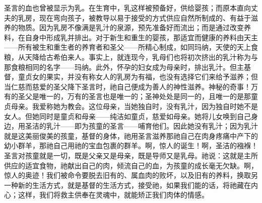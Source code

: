 圣言的血也曾被显示为乳。在生育中，乳这样被预备好，供给婴孩；而原本直向丈夫的乳房，现在弯向孩子，被教导以易于接受的方式供应自然所制成的、有益于滋养的物质。因为乳房不像满是乳汁的泉源，预先准备好而流出；而是通过改变养料，在自身中形成乳并排出。对于新生和重生的婴孩，那适宜而健康的养料由天主——所有被生和重生者的养育者和圣父——所精心制成，如同玛纳，天使的天上食粮，从天降给古希伯来人。事实上，就连现今，乳母们也将初次挤出的乳汁称为与那食粮相同的名字——玛纳。此外，怀孕的妇女成为母亲时，排出乳汁。但主基督，童贞女的果实，并没有称女人的乳房为有福，也没有选择它们来给予滋养；但当仁慈而慈爱的圣父降下圣言时，祂自己便成为善人的神性滋养。神秘的奇事！万有的圣父是唯一的，万有的圣言也是唯一的；圣神处处是同一的，且唯一的是那童贞母亲。我爱称她为教会。这位母亲，当她独自时，没有乳汁，因为独自时她不是女人。但她同时是童贞和母亲——纯洁如童贞，慈爱如母亲。她将儿女唤到自己身边，用圣洁的乳汁——即为孩童的圣言——哺育他们。因此她没有乳汁；因为乳汁就是这美丽俊美的孩童，基督的身体，祂用圣言滋养那祂自己在肉身疼痛中产下的幼小群羊，那祂自己用祂的宝血包裹的群羊。啊，惊人的诞生！啊，圣洁的襁褓！圣言对孩童就是一切，既是父亲又是母亲，既是导师又是乳母。祂说：这就是主所供应的适宜食物，祂献出自己的肉，倾流自己的血，为孩童的成长毫无欠缺。啊，惊人的奥迹！我们被命令要脱去旧有的、属血肉的败坏，以及旧有的养料，换取另一种新的生活方式，就是基督的生活方式，接受祂，如果我们能的话，将祂藏在内心；这样，我们将救主供奉在灵魂中，就能矫正我们肉体的情感。\par

